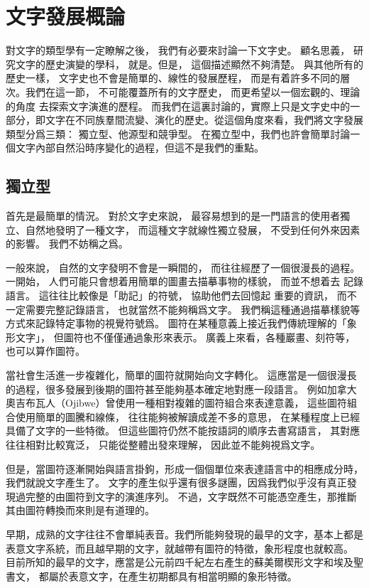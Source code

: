\section{文字發展概論}
對文字的類型學有一定瞭解之後，
我們有必要來討論一下文字史。
顧名思義，
研究文字的歷史演變的學科，
就是。但是，
這個描述顯然不夠清楚。
與其他所有的歷史一樣，
文字史也不會是簡單的、線性的發展歷程，
而是有着許多不同的層次。我們在這一節，
不可能覆蓋所有的文字歷史，
而更希望以一個宏觀的、理論的角度
去探索文字演進的歷程。
而我們在這裏討論的，實際上只是文字史中的一部分，即文字在不同族羣間流變、演化的歷史。從這個角度來看，我們將文字發展類型分爲三類：
獨立型、他源型和競爭型。
在獨立型中，我們也許會簡單討論一個文字內部自然沿時序變化的過程，但這不是我們的重點。

\subsection{獨立型}
首先是最簡單的情況。
對於文字史來說，
最容易想到的是一門語言的使用者獨立、自然地發明了一種文字，
而這種文字就線性獨立發展，
不受到任何外來因素的影響。
我們不妨稱之爲。

一般來說，
自然的文字發明不會是一瞬間的，
而往往經歷了一個很漫長的過程。
一開始，
人們可能只會想着用簡單的圖畫去描摹事物的樣貌，
而並不想着去
記錄語言。
這往往比較像是「助記」的符號，
協助他們去回憶起
重要的資訊，
而不一定需要完整記錄語言，
也就當然不能夠稱爲文字。
我們稱這種通過描摹樣貌等方式來記錄特定事物的視覺符號爲。
圖符在某種意義上接近我們傳統理解的「象形文字」，
但圖符也不僅僅通過象形來表示。
廣義上來看，各種巖畫、刻符等，也可以算作圖符。

當社會生活進一步複雜化，簡單的圖符就開始向文字轉化。
這應當是一個很漫長的過程，很多發展到後期的圖符甚至能夠基本確定地對應一段語言。
例如加拿大奧吉布瓦人（Ojibwe）曾使用一種相對複雜的圖符組合來表達意義，
這些圖符組合使用簡單的圖騰和線條，
往往能夠被解讀成差不多的意思，
在某種程度上已經具備了文字的一些特徵。
但這些圖符仍然不能按語詞的順序去書寫語言，
其對應往往相對比較寬泛，
只能從整體出發來理解，
因此並不能夠視爲文字。

但是，當圖符逐漸開始與語言掛鉤，形成一個個單位來表達語言中的相應成分時，我們就說文字產生了。
文字的產生似乎還有很多謎團，因爲我們似乎沒有真正發現過完整的由圖符到文字的演進序列。
不過，文字既然不可能憑空產生，那推斷其由圖符轉換而來則是有道理的。

早期，成熟的文字往往不會單純表音。我們所能夠發現的最早的文字，基本上都是表意文字系統，而且越早期的文字，就越帶有圖符的特徵，象形程度也就較高。
目前所知的最早的文字，應當是公元前四千紀左右產生的蘇美爾楔形文字和埃及聖書文，
都屬於表意文字，在產生初期都具有相當明顯的象形特徵。

